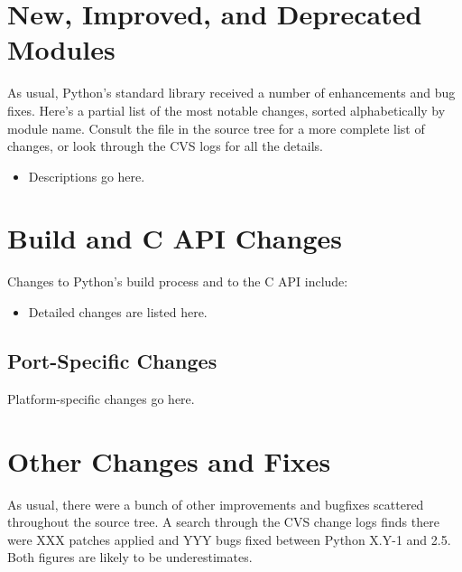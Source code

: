 \documentclass{howto}
\begin{document}
\section{New, Improved, and Deprecated Modules}

As usual, Python's standard library received a number of enhancements and
bug fixes.  Here's a partial list of the most notable changes, sorted
alphabetically by module name. Consult the
 file in the source tree for a more
complete list of changes, or look through the CVS logs for all the
details.

\begin{itemize}

\item Descriptions go here.

\end{itemize}




\section{Build and C API Changes}

Changes to Python's build process and to the C API include:

\begin{itemize}

\item Detailed changes are listed here.

\end{itemize}


\subsection{Port-Specific Changes}

Platform-specific changes go here.


\section{Other Changes and Fixes \label{section-other}}

As usual, there were a bunch of other improvements and bugfixes
scattered throughout the source tree.  A search through the CVS change
logs finds there were XXX patches applied and YYY bugs fixed between
Python X.Y-1 and 2.5.  Both figures are likely to be underestimates.
\end{document}
